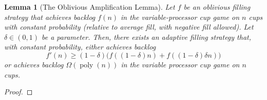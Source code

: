 \documentclass[twocolumn]{article}[10pt]
\DeclareMathOperator{\poly}{\text{poly}}
\newtheorem{lemma}{Lemma}
\begin{document}
\begin{lemma}[The Oblivious Amplification Lemma]
   \label{lem:obliviousAmplification}
  Let $f$ be an oblivious filling strategy that achieves backlog $f(n)$ in the
  variable-processor cup game on $n$ cups with constant probability (relative
  to average fill, with negative fill allowed). Let $\delta \in (0,1)$ be a
  parameter. Then, there exists an adaptive filling strategy that, with
  constant probability, either achieves backlog $$f'(n) \ge
  (1-\delta)\Big(f((1-\delta)n) + f((1-\delta)\delta n)\Big)$$ or achieves
  backlog $\Omega(\poly(n))$ in the variable processor cup game on $n$
  cups.
\end{lemma}
\begin{proof}
  
\end{proof}
\end{document}
